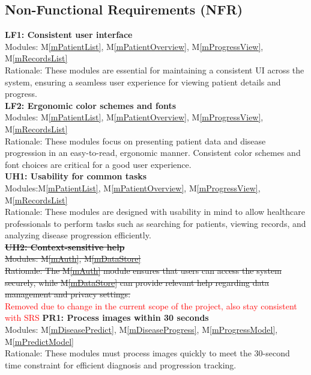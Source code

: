 \documentclass[12pt, titlepage]{article}
\newcommand{\mref}[1]{M\ref{#1}}
\begin{document}
\subsection{Non-Functional Requirements (NFR)}
\textbf{LF1: Consistent user interface} \\
Modules: \mref{mPatientList}, \mref{mPatientOverview}, \mref{mProgressView}, \mref{mRecordsList} \\
Rationale: These modules are essential for maintaining a consistent UI across the system, ensuring a seamless user experience for viewing patient details and progress. \\
\newline
\textbf{LF2: Ergonomic color schemes and fonts} \\
Modules: \mref{mPatientList}, \mref{mPatientOverview}, \mref{mProgressView}, \mref{mRecordsList} \\
Rationale: These modules focus on presenting patient data and disease progression in an easy-to-read, ergonomic manner. Consistent color schemes and font choices are critical for a good user experience. \\
\newline
\textbf{UH1: Usability for common tasks} \\
Modules:\mref{mPatientList}, \mref{mPatientOverview}, \mref{mProgressView}, \mref{mRecordsList}\\
Rationale: These modules are designed with usability in mind to allow healthcare professionals to perform tasks such as searching for patients, viewing records, and analyzing disease progression efficiently. \\
\newline
\sout{\textbf{UH2: Context-sensitive help}} \\
\sout{Modules: \mref{mAuth}, \mref{mDataStore}} \\
\sout{Rationale: The \mref{mAuth} module ensures that users can access the system securely, while \mref{mDataStore} can provide relevant help regarding data management and privacy settings.} \\
\textcolor{red}{Removed due to change in the current scope of the project, also stay consistent with SRS}
\newline
\textbf{PR1: Process images within 30 seconds} \\
Modules: \mref{mDiseasePredict}, \mref{mDiseaseProgress}, \mref{mProgressModel}, \mref{mPredictModel} \\
Rationale: These modules must process images quickly to meet the 30-second time constraint for efficient diagnosis and progression tracking. \\
\end{document}
